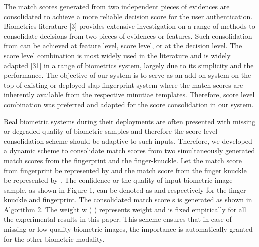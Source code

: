 The match scores generated from two independent pieces of evidences are consolidated to achieve a more reliable decision score for the user authentication. Biometrics literature [3] provides extensive investigation on a range of methods to consolidate decisions from two pieces of evidences or features. Such consolidation from can be achieved at feature level, score level, or at the decision level. The score level combination is most widely used in the literature and is widely adapted [31] in a range of biometrics system, largely due to its simplicity and the performance. The objective of our system is to serve as an add-on system on the top of existing or deployed slap-fingerprint system where the match scores are inherently available from the respective minutiae templates. Therefore, score level combination was preferred and adapted for the score consolidation in our system. 

Real biometric systems during their deployments are often presented with missing or degraded quality of biometric samples and therefore the score-level consolidation scheme should be adaptive to such inputs. Therefore, we developed a dynamic scheme to consolidate match scores from two simultaneously generated match scores from the fingerprint and the finger-knuckle. Let the match score from fingerprint be represented by  and the match score from the finger knuckle be represented by . The confidence or the quality of input biometric image sample, as shown in Figure 1, can be denoted as  and  respectively for the finger knuckle and fingerprint. The consolidated match score s is generated as shown in Algorithm 2. The weight w ( )  represents weight and is fixed empirically for all the experimental results in this paper. This scheme ensures that in case of missing or low quality biometric images, the importance is automatically granted for the other biometric modality.  